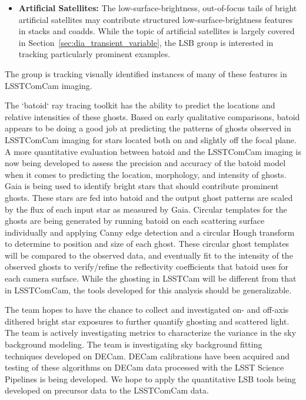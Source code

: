 \begin{itemize}
\item {\bf Artificial Satellites:} The low-surface-brightness, out-of-focus tails of bright artificial satellites may contribute structured low-surface-brightness features in stacks and coadds. While the topic of artificial satellites is largely covered in Section~\ref{sec:dia_transient_variable}, the LSB group is interested in tracking particularly prominent examples.

\end{itemize}

The group is tracking visually identified instances of many of these features in LSSTComCam imaging.

  The `batoid` ray tracing toolkit has the ability to predict the locations and relative intensities of these ghosts. Based on early qualitative comparisons, batoid appears to be doing a good job at predicting the patterns of ghosts observed in LSSTComCam imaging for stars located both on and slightly off the focal plane. A more quantitative evaluation between batoid and the LSSTComCam imaging is now being developed to assess the precision and accuracy of the batoid model when it comes to predicting the location, morphology, and intensity of ghosts. Gaia is being used to identify bright stars that should contribute prominent ghosts. These stars are fed into batoid and the output ghost patterns are scaled by the flux of each input star as measured by Gaia. Circular templates for the ghosts are being generated by running batoid on each scattering surface individually and applying Canny edge detection and a circular Hough transform to determine to position and size of each ghost. These circular ghost templates will be compared to the observed data, and eventually fit to the intensity of the observed ghosts to verify/refine the reflectivity coefficients that batoid uses for each camera surface. While the ghosting in LSSTCam will be different from that in LSSTComCam, the tools developed for this analysis should be generalizable.


The team hopes to have the chance to collect and investigated on- and off-axis dithered bright star exposures to further quantify ghosting and scattered light. The team is actively investigating metrics to characterize the variance in the sky background modeling. The team is investigating sky background fitting techniques developed on DECam. DECam calibrations have been acquired and testing of these algorithms on DECam data processed with the LSST Science Pipelines is being developed. We hope to apply the quantitative LSB tools being developed on precursor data to the LSSTComCam data.
